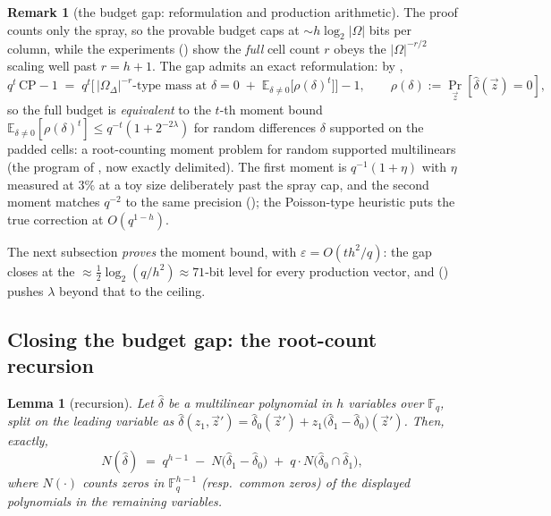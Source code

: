 \documentclass{article}
\newcommand{\Fq}{\mathbb{F}_q}
\newtheorem{lemma}[theorem]{Lemma}
\theoremstyle{definition}
\newtheorem{remark}[theorem]{Remark}
\begin{document}
\begin{remark}[the budget gap: reformulation and production arithmetic]\label{rem:gap}
The proof counts only the spray, so the provable budget caps at $\sim h \log_2 |\Omega|$ bits per column, while the experiments () show the \emph{full} cell count $r$ obeys the $|\Omega|^{-r/2}$ scaling well past $r = h + 1$. The gap admits an exact reformulation: by ,
\[
q^t\, \mathrm{CP} - 1 \;=\; q^t\Big[\, |\Omega_\Delta|^{-r}\text{-type mass at } \delta = 0 \;+\; \mathbb{E}_{\delta \neq 0}\big[\rho(\delta)^t\big] \Big] - 1 , \qquad \rho(\delta) := \Pr_{\vec z}[\hat\delta(\vec z) = 0] ,
\]
so the full budget is \emph{equivalent} to the $t$-th moment bound $\mathbb{E}_{\delta \neq 0}[\rho(\delta)^t] \leq q^{-t}(1 + 2^{-2\lambda})$ for random differences $\delta$ supported on the padded cells: a root-counting moment problem for random supported multilinears (the program of , now exactly delimited). The first moment is $q^{-1}(1 + \eta)$ with $\eta$ measured at $3\%$ at a toy size deliberately past the spray cap, and the second moment matches $q^{-2}$ to the same precision (); the Poisson-type heuristic puts the true correction at $O(q^{1-h})$.

The next subsection \emph{proves} the moment bound, with $\varepsilon = O(t h^2/q)$: the gap closes at the $\approx \tfrac12 \log_2(q/h^2) \approx 71$-bit level for every production vector, and  () pushes $\lambda$ beyond that to the ceiling.
\end{remark}

\subsection{Closing the budget gap: the root-count recursion}\label{sec:moment}

\begin{lemma}[recursion]\label{lem:recursion}
Let $\hat\delta$ be a multilinear polynomial in $h$ variables over $\Fq$, split on the leading variable as $\hat\delta(z_1, \vec z') = \hat\delta_0(\vec z') + z_1 \big(\hat\delta_1 - \hat\delta_0\big)(\vec z')$. Then, \emph{exactly},
\[
N(\hat\delta) \;=\; q^{h-1} \;-\; N\big(\hat\delta_1 - \hat\delta_0\big) \;+\; q \cdot N\big(\hat\delta_0 \cap \hat\delta_1\big) ,
\]
where $N(\cdot)$ counts zeros in $\Fq^{h-1}$ (resp.\ common zeros) of the displayed polynomials in the remaining variables.
\end{lemma}
\end{document}
